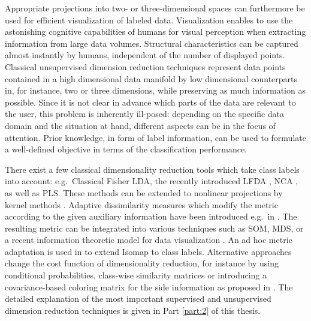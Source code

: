 Appropriate projections into two- or three-dimensional spaces can furthermore be used for efficient visualization of labeled data. 
Visualization enables to use the astonishing cognitive capabilities of humans for visual perception when extracting 
information from large data volumes. 
Structural characteristics can be captured almost instantly by humans, independent of the number of displayed points. 
Classical unsupervised dimension reduction techniques represent data points contained in a
high dimensional data manifold by low dimensional counterparts in, for instance, two
or three dimensions, while preserving as much information as possible. 
Since it is not clear in advance which parts of the data are relevant to the user, this problem is inherently
ill-posed: depending on the specific data domain and the situation at hand, different aspects can be in the focus of attention. 
Prior knowledge, in form of label information, can be used to formulate a well-defined objective in terms of the 
classification performance. 

There exist a few classical dimensionality reduction tools which take class labels into account:
e.g.\ Classical Fisher \ac{LDA}, the recently introduced \ac{LFDA} \cite{Sugiyama2007}, 
\ac{NCA} \cite{Goldberger2004}, as well as \ac{PLS}. %
These methods can be extended to nonlinear projections by kernel methods \cite{Ma2007,Baudat2000}.  
Adaptive dissimilarity measures which modify the metric %
according to the given auxiliary information have been introduced e.g.\ in 
\cite{Kaski2001,Peltonen2004,Bunte_ESANN2009a,Bunte_CAIP2009_NLdimred,BunteESANNSI2009}.%
The resulting metric can be integrated into various techniques such as \ac{SOM}, \ac{MDS}, 
or a recent information theoretic
model for data visualization \cite{Kaski2001,Peltonen2004,Venna2010}.
An ad hoc metric adaptation is used in \cite{Geng2005} to extend Isomap \cite{Tenenbaum2000} to class labels.
Alternative approaches change the cost function of dimensionality reduction, for instance 
by using conditional probabilities, class-wise similarity matrices 
or introducing a covariance-based coloring matrix for the side information as proposed in \cite{Iwata2007,Memisevic2005,Song2008}. 
The detailed explanation of the most important supervised and unsupervised dimension reduction techniques is 
given in Part \ref{part:2} %
of this thesis. 

